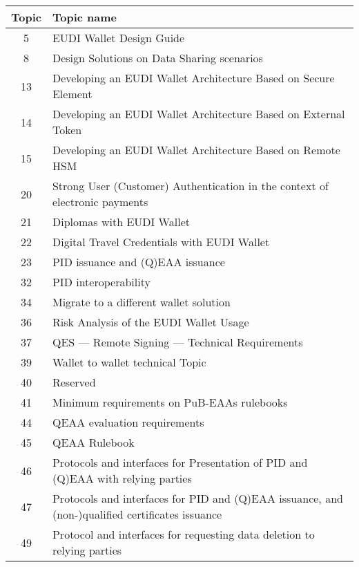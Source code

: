 \footnotesize
\begin{longtable}{|c|p{}|}
\hline
\textbf{Topic} & \textbf{Topic name} \\
\hline
\endhead

5 & EUDI Wallet Design Guide \\
\hline

8 & Design Solutions on Data Sharing scenarios \\
\hline

13 & Developing an EUDI Wallet Architecture Based on Secure Element \\
\hline

14 & Developing an EUDI Wallet Architecture Based on External Token \\
\hline

15 & Developing an EUDI Wallet Architecture Based on Remote HSM \\
\hline

20 & Strong User (Customer) Authentication in the context of electronic payments \\
\hline

21 & Diplomas with EUDI Wallet \\
\hline

22 & Digital Travel Credentials with EUDI Wallet \\
\hline

23 & PID issuance and (Q)EAA issuance \\
\hline

32 & PID interoperability \\
\hline

34 & Migrate to a different wallet solution \\
\hline

36 & Risk Analysis of the EUDI Wallet Usage \\
\hline

37 & QES — Remote Signing — Technical Requirements \\
\hline

39 & Wallet to wallet technical Topic \\
\hline

40 & Reserved \\
\hline

41 & Minimum requirements on PuB-EAAs rulebooks \\
\hline

44 & QEAA evaluation requirements \\
\hline

45 & QEAA Rulebook \\
\hline

46 & Protocols and interfaces for Presentation of PID and (Q)EAA with relying parties \\
\hline

47 & Protocols and interfaces for PID and (Q)EAA issuance, and (non-)qualified certificates issuance \\
\hline

49 & Protocol and interfaces for requesting data deletion to relying parties \\
\hline

\end{longtable}


